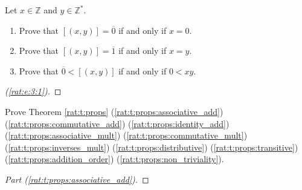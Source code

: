 \Newpage
\begin{exercise} %
	\label{rat:e:3}
	Let $x \in \mathbb{Z}$ and $y \in \mathbb{Z}^{*}$.
	\begin{enumerate}
		\item Prove that $[(x, y)] = \overline{0}$ if and only if $x = 0$. \label{rat:e:3:1}
		\item Prove that $[(x, y)] = \overline{1}$ if and only if $x = y$. \label{rat:e:3:2}
		\item Prove that $\overline{0} < [(x, y)]$ if and only if $0 < x y$. \label{rat:e:3:3}
	\end{enumerate}
\end{exercise}

\begin{proof}[(\ref{rat:e:3:1})]
	\TODO
\end{proof}



\Newpage
\begin{exercise} %
	Prove Theorem \ref{rat:t:props} (\ref{rat:t:props:associative_add}) (\ref{rat:t:props:commutative_add}) (\ref{rat:t:props:identity_add}) (\ref{rat:t:props:associative_mult}) (\ref{rat:t:props:commutative_mult}) (\ref{rat:t:props:inverses_mult}) (\ref{rat:t:props:distributive}) (\ref{rat:t:props:transitive}) (\ref{rat:t:props:addition_order}) (\ref{rat:t:props:non_triviality}).
\end{exercise}

\begin{proof}[Part (\ref{rat:t:props:associative_add})]
	\TODO
\end{proof}



